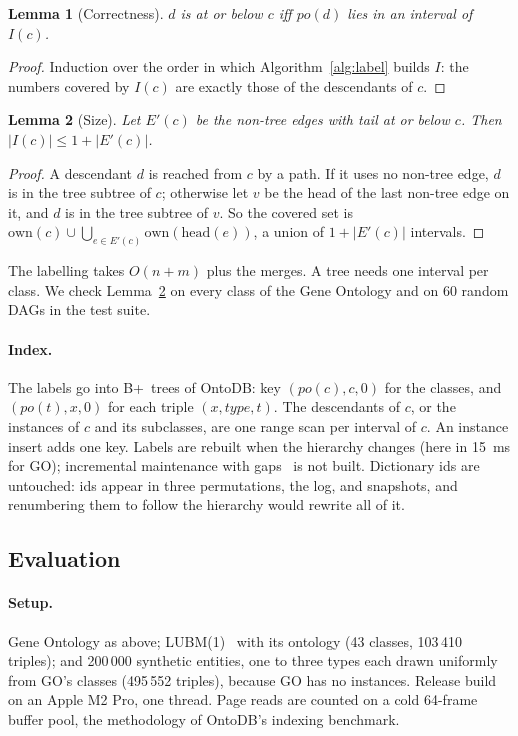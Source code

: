 \documentclass[sigconf, nonacm]{acmart}
\newcommand{\sys}{OntoDB}
\newtheorem{lemma}{Lemma}
\begin{document}
\begin{lemma}[Correctness]
$d$ is at or below $c$ iff $\mathit{po}(d)$ lies in an interval of $I(c)$.
\end{lemma}
\begin{proof}
Induction over the order in which Algorithm~\ref{alg:label} builds $I$: the numbers covered by $I(c)$ are exactly those of the descendants of $c$.
\end{proof}

\begin{lemma}[Size]\label{lem:size}
Let $E'(c)$ be the non-tree edges with tail at or below $c$. Then $|I(c)|\le 1+|E'(c)|$.
\end{lemma}
\begin{proof}
A descendant $d$ is reached from $c$ by a path. If it uses no non-tree edge, $d$ is in the tree subtree of $c$; otherwise let $v$ be the head of the last non-tree edge on it, and $d$ is in the tree subtree of $v$. So the covered set is $\mathrm{own}(c)\cup\bigcup_{e\in E'(c)}\mathrm{own}(\mathrm{head}(e))$, a union of $1+|E'(c)|$ intervals.
\end{proof}

The labelling takes $O(n+m)$ plus the merges. A tree needs one interval per class. We check Lemma~\ref{lem:size} on every class of the Gene Ontology and on 60 random DAGs in the test suite.

\paragraph{Index.} The labels go into B+~trees of \sys: key $(\mathit{po}(c),c,0)$ for the classes, and $(\mathit{po}(t),x,0)$ for each triple $(x,\mathit{type},t)$. The descendants of $c$, or the instances of $c$ and its subclasses, are one range scan per interval of $c$. An instance insert adds one key. Labels are rebuilt when the hierarchy changes (here in 15~ms for GO); incremental maintenance with gaps~\cite{agrawal1989} is not built. Dictionary ids are untouched: ids appear in three permutations, the log, and snapshots, and renumbering them to follow the hierarchy would rewrite all of it.

\subsection{Evaluation}

\paragraph{Setup.} Gene Ontology as above; LUBM(1)~\cite{lubm} with its ontology (43 classes, 103\,410 triples); and 200\,000 synthetic entities, one to three types each drawn uniformly from GO's classes (495\,552 triples), because GO has no instances. Release build on an Apple M2 Pro, one thread. Page reads are counted on a cold 64-frame buffer pool, the methodology of \sys's indexing benchmark.
\end{document}
